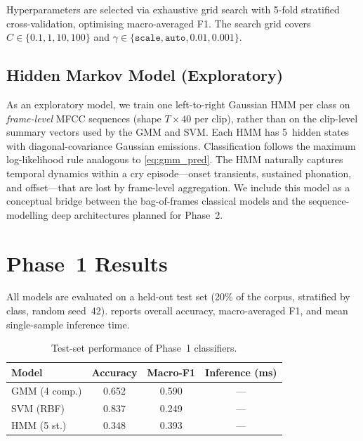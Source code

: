 \documentclass[conference]{IEEEtran}
\begin{document}
Hyperparameters are selected via exhaustive grid search with 5-fold
stratified cross-validation, optimising macro-averaged F1.  The search
grid covers $C \in \{0.1, 1, 10, 100\}$ and
$\gamma \in \{\texttt{scale}, \texttt{auto}, 0.01, 0.001\}$.

\subsection{Hidden Markov Model (Exploratory)}
\label{sec:hmm}

As an exploratory model, we train one left-to-right Gaussian HMM per
class on \emph{frame-level} MFCC sequences (shape $T \times 40$ per
clip), rather than on the clip-level summary vectors used by the GMM and
SVM.  Each HMM has 5~hidden states with diagonal-covariance Gaussian
emissions.  Classification follows the maximum log-likelihood rule
analogous to \cref{eq:gmm_pred}.  The HMM naturally captures temporal
dynamics within a cry episode---onset transients, sustained phonation,
and offset---that are lost by frame-level aggregation.  We include this
model as a conceptual bridge between the bag-of-frames classical models
and the sequence-modelling deep architectures planned for Phase~2.

\section{Phase~1 Results}
\label{sec:results}

All models are evaluated on a held-out test set (20\% of the corpus,
stratified by class, random seed~42).   reports
overall accuracy, macro-averaged F1, and mean single-sample inference
time.

\begin{table}[t]
  \centering
  \caption{Test-set performance of Phase~1 classifiers.}
  \label{tab:results}
  \begin{tabular}{lccc}
    \toprule
    \textbf{Model} & \textbf{Accuracy} & \textbf{Macro-F1} &
      \textbf{Inference (ms)} \\
    \midrule
    GMM (4 comp.) & 0.652 & 0.590 & --- \\
    SVM (RBF)     & 0.837 & 0.249 & --- \\
    HMM (5 st.)   & 0.348 & 0.393 & --- \\
    \bottomrule
  \end{tabular}
\end{table}
\end{document}

